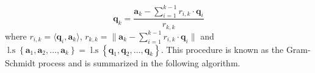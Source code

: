 \begin{equation}\label{eq: comp_orth_basis}
    \bm{q}_k = \frac{\bm{a}_k - \sum_{i=1}^{k-1} r_{i,k} \cdot \bm{q}_i}{r_{k,k}}
\end{equation}
where $r_{i,k} = \langle \bm{q}_i, \bm{a}_k \rangle$, $r_{k,k} = \| \bm{a}_k - \sum_{i=1}^{k-1} r_{i,k} \cdot \bm{q}_i \|$ and $\operatorname{l.s} \left\{ \bm{a}_1, \bm{a}_2, \ldots , \bm{a}_k \right\} = \operatorname{l.s} \left\{ \bm{q}_1, \bm{q}_2, \ldots , \bm{q}_k \right\}$. This procedure is known as the Gram-Schmidt process \cites{BerezanskyMakarovich1996FaV1,TrefethenLloydN.LloydNicholas1997Nla/,DemmelJamesW1997Anla} and is summarized in the following algorithm.




